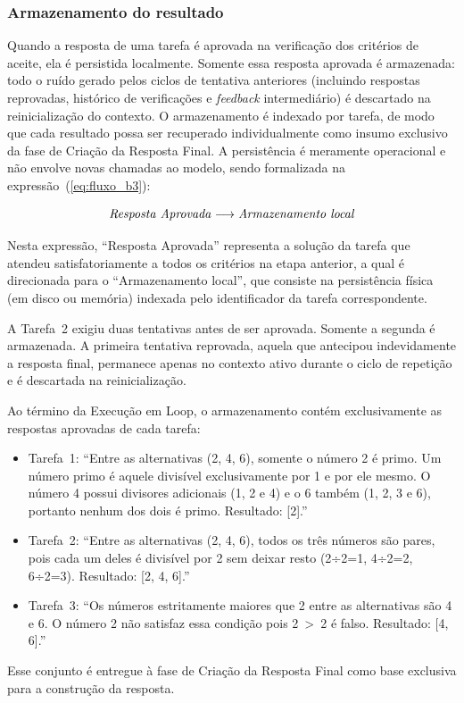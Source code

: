 \documentclass[a4paper,10pt,twocolumn]{article}
\begin{document}
\subsubsection{Armazenamento do resultado} \label{subsec:ExecucaoB3}

Quando a resposta de uma tarefa é aprovada na verificação dos critérios de aceite, ela é persistida localmente. Somente essa resposta aprovada é armazenada: todo o ruído gerado pelos ciclos de tentativa anteriores (incluindo respostas reprovadas, histórico de verificações e \textit{feedback} intermediário) é descartado na reinicialização do contexto. O armazenamento é indexado por tarefa, de modo que cada resultado possa ser recuperado individualmente como insumo exclusivo da fase de Criação da Resposta Final. A persistência é meramente operacional e não envolve novas chamadas ao modelo, sendo formalizada na expressão~(\ref{eq:fluxo_b3}):

\begin{equation} \label{eq:fluxo_b3}
\text{\textit{Resposta Aprovada}} \longrightarrow \text{\textit{Armazenamento local}}
\end{equation}

Nesta expressão, ``Resposta Aprovada'' representa a solução da tarefa que atendeu satisfatoriamente a todos os critérios na etapa anterior, a qual é direcionada para o ``Armazenamento local'', que consiste na persistência física (em disco ou memória) indexada pelo identificador da tarefa correspondente.

\begin{exemplo}
A Tarefa~2 exigiu duas tentativas antes de ser aprovada. Somente a segunda é armazenada. A primeira tentativa reprovada, aquela que antecipou indevidamente a resposta final, permanece apenas no contexto ativo durante o ciclo de repetição e é descartada na reinicialização.

Ao término da Execução em Loop, o armazenamento contém exclusivamente as respostas aprovadas de cada tarefa:

\begin{itemize}
  \item Tarefa~1: ``Entre as alternativas (2, 4, 6), somente o número 2 é primo. Um número primo é aquele divisível exclusivamente por 1 e por ele mesmo. O número 4 possui divisores adicionais (1, 2 e 4) e o 6 também (1, 2, 3 e 6), portanto nenhum dos dois é primo. Resultado: [2].''
  \item Tarefa~2: ``Entre as alternativas (2, 4, 6), todos os três números são pares, pois cada um deles é divisível por 2 sem deixar resto (2÷2=1, 4÷2=2, 6÷2=3). Resultado: [2, 4, 6].''
  \item Tarefa~3: ``Os números estritamente maiores que 2 entre as alternativas são 4 e 6. O número 2 não satisfaz essa condição pois 2~>~2 é falso. Resultado: [4, 6].''
\end{itemize}

Esse conjunto é entregue à fase de Criação da Resposta Final como base exclusiva para a construção da resposta.
\end{exemplo}
\end{document}
